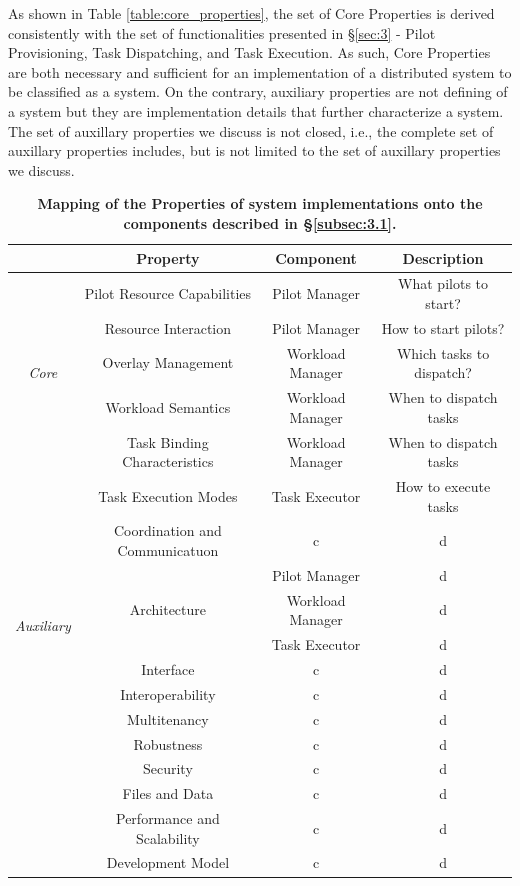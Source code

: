\documentclass{sig-alternate}
\begin{document}
As shown in Table \ref{table:core_properties}, the set of Core Properties is
derived consistently with the set of functionalities presented in
\S\ref{sec:3} - Pilot Provisioning, Task Dispatching, and Task Execution.
As such, Core Properties are both necessary and sufficient for an
implementation of a distributed system to be classified as a \pilot system.
On the contrary, auxiliary properties are not defining of a \pilot system but
they are implementation details that further characterize a \pilot system.  The
set of auxillary properties we discuss is not closed, i.e., the complete set of
auxillary properties includes, but is not limited to the set of auxillary
properties we discuss.

\begin{table}
\centering
\begin{tabular}{c|c|c|c|}
\cline{2-4}
& \textbf{Property} & \textbf{Component} & \textbf{Description} \\
\hline
\multirow{5}{*}{\textit{Core}}
  & Pilot Resource Capabilities & Pilot Manager & What pilots to start? \\
  \cline{2-4}
  & Resource Interaction & Pilot Manager & How to start pilots? \\
  \cline{2-4}
  & Overlay Management & Workload Manager & Which tasks to dispatch? \\
  \cline{2-4}
  & Workload Semantics & Workload Manager & When to dispatch tasks \\
  \cline{2-4}
  & Task Binding Characteristics & Workload Manager & When to dispatch tasks \\
  \cline{2-4}
  & Task Execution Modes & Task Executor & How to execute tasks \\
\hline
\multirow{7}{*}{\textit{Auxiliary}}
  & Coordination and Communicatuon & c & d \\
  \cline{2-4}
  & \multirow{3}{*}{Architecture}
    & Pilot Manager & d \\
    \cline{3-4}
    & & Workload Manager & d \\
    \cline{3-4}
    & & Task Executor & d \\
  \cline{2-4}
  & Interface & c & d \\
  \cline{2-4}
  & Interoperability & c & d \\
  \cline{2-4}
  & Multitenancy & c & d \\
  \cline{2-4}
  & Robustness & c & d \\
  \cline{2-4}
  & Security & c & d \\
  \cline{2-4}
  & Files and Data & c & d \\
  \cline{2-4}
  & Performance and Scalability & c & d \\
  \cline{2-4}
  & Development Model & c & d \\
\hline
\end{tabular}
\caption{\textbf{Mapping of the Properties of \pilot system implementations
onto the components described in \S\ref{subsec:3.1}.}}
\label{table:property_component_mapping}
\end{table}
\end{document}
